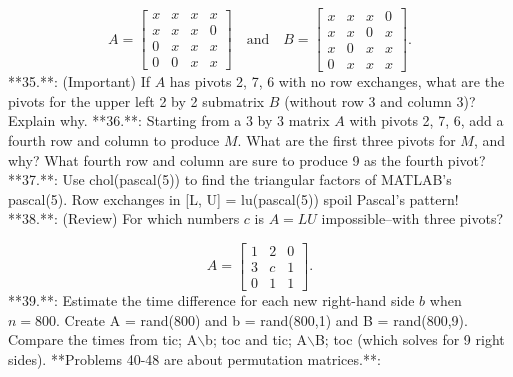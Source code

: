 \[A=\begin{bmatrix}x&x&x&x\\ x&x&x&0\\ 0&x&x&x\\ 0&0&x&x\end{bmatrix}\quad\text{and}\quad B=\begin{bmatrix}x&x&x&0\\ x&x&0&x\\ x&0&x&x\\ 0&x&x&x\end{bmatrix}.\]
**35.**: (Important) If \(A\) has pivots 2, 7, 6 with no row exchanges, what are the pivots for the upper left 2 by 2 submatrix \(B\) (without row 3 and column 3)? Explain why.
**36.**: Starting from a 3 by 3 matrix \(A\) with pivots 2, 7, 6, add a fourth row and column to produce \(M\). What are the first three pivots for \(M\), and why? What fourth row and column are sure to produce 9 as the fourth pivot?
**37.**: Use chol(pascal(5)) to find the triangular factors of MATLAB's pascal(5). Row exchanges in [L, U] = lu(pascal(5)) spoil Pascal's pattern!
**38.**: (Review) For which numbers \(c\) is \(A=LU\) impossible--with three pivots?

\[A=\begin{bmatrix}1&2&0\\ 3&c&1\\ 0&1&1\end{bmatrix}.\]
**39.**: Estimate the time difference for each new right-hand side \(b\) when \(n=800\). Create A = rand(800) and b = rand(800,1) and B = rand(800,9). Compare the times from tic; A\(\backslash\)b; toc and tic; A\(\backslash\)B; toc (which solves for 9 right sides).
**Problems 40-48 are about permutation matrices.**: